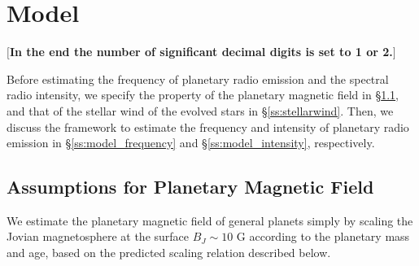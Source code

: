 \documentclass[iop,numberedappendix,apj]{emulateapj}
\def\memoYF#1{\color{red}$[${\bf #1}$]$ \color{black}}
\begin{document}


\section{Model}
\label{s:assumptions}

\memoYF{In the end the number of significant decimal digits is set to 1 or 2.}

Before estimating the frequency of planetary radio emission and the spectral radio intensity, we specify the property of the planetary magnetic field in \S\ref{ss:magneticfield}, and that of the stellar wind of the evolved stars in \S\ref{ss:stellarwind}.  
Then, we discuss the framework to estimate the frequency and intensity of planetary radio emission in \S\ref{ss:model_frequency} and \S\ref{ss:model_intensity}, respectively. 



\subsection{Assumptions for Planetary Magnetic Field}
\label{ss:magneticfield}

We estimate the planetary magnetic field of general planets  
simply by scaling the Jovian magnetosphere at the surface $B_J \sim 10$ G according to the planetary mass and age, based on the predicted scaling relation described below. 
\end{document}
